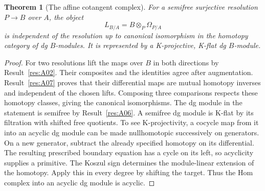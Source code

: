 \documentclass[11pt,oneside,openany]{book}
\newtheorem{theorem}{Theorem}[chapter]
\theoremstyle{definition}
\theoremstyle{remark}
\begin{document}
\begin{theorem}[The affine cotangent complex]\label{res:A08}
For a semifree surjective resolution \(P\to B\) over \(A\), the
object
\[
       L_{B/A}=B\otimes_P\Omega_{P/A}
\]
is independent of the resolution up to canonical isomorphism in
the homotopy category of dg \(B\)-modules. It is represented by
a K-projective, K-flat dg \(B\)-module.
\end{theorem}
\begin{proof}
For two resolutions lift the maps over \(B\) in both directions
by Result~\ref{res:A02}. Their composites and the identities
agree after augmentation. Result~\ref{res:A07} proves that their
differential maps are mutual homotopy inverses and independent
of the chosen lifts. Composing three comparisons respects these
homotopy classes, giving the canonical isomorphisms.
The dg module in the statement is semifree by
Result~\ref{res:A06}. A semifree dg module is K-flat by its
filtration with shifted free quotients. To see K-projectivity,
a cocycle map from it into an acyclic dg module can be made
nullhomotopic successively on generators. On a new generator,
subtract the already specified homotopy on its differential.
The resulting prescribed boundary equation has a cycle on
its left, so acyclicity supplies a primitive. The Koszul sign
determines the module-linear extension of the homotopy.
Apply this in every degree by shifting the target. Thus the
Hom complex into an acyclic dg module is acyclic.
\end{proof}
\end{document}
